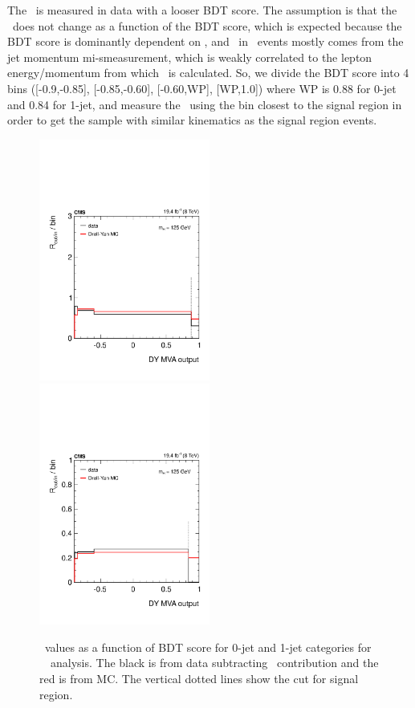 The \routin\ is measured in data with a looser BDT score. 
The assumption is that the \routin\ does not change as a function of 
the BDT score, which is expected because the BDT score is dominantly dependent on \met,
and \met\ in \dyll\ events mostly comes from the jet momentum mi-smeasurement, 
which is weakly correlated to the lepton energy/momentum from which 
\mll\ is calculated. So, we divide the BDT score into 4 bins
([-0.9,-0.85], [-0.85,-0.60], [-0.60,WP], [WP,1.0]) where WP 
is 0.88 for 0-jet and 0.84 for 1-jet, and measure the 
\routin\ using the bin closest to the signal region in order to get the 
sample with similar kinematics as the signal region events.  
\begin{figure}[ht!] 
\centering 
\includegraphics[width=0.5\textwidth]{figures/Routin_0Jet_mH125_19467pb_dy.pdf} 
\includegraphics[width=0.5\textwidth]{figures/Routin_1Jet_mH125_19467pb_dy.pdf} 
\caption{\routin\ values as a function of BDT score for 0-jet and 1-jet categories
for ~\GeV\ analysis. 
The black is from data subtracting \vv\ contribution and the red is from MC. 
The vertical dotted lines show the cut for signal region.} 
\label{fig:routin_mh125} 
\end{figure} 
